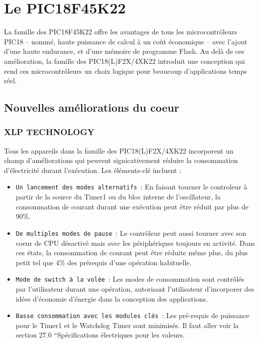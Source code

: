 \documentclass[a4paper, 12pt]{book}
\newcounter{program}[subsection]
\begin{document}
\chapter{Le PIC18F45K22}
La famille des PIC18F45K22 offre les avantages de tous les microcontrôleurs  PIC18 – nommé, haute puissance de calcul à un coût économique – avec l’ajout d’une haute endurance, et d’une mémoire de programme Flash. Au delà de ces amélioration, la famille des PIC18(L)F2X/4XK22 introduit une conception qui rend ces microcontrôleurs un choix logique pour beaucoup d’applications temps réel.\\

\section{Nouvelles améliorations du coeur}
\subsection{XLP TECHNOLOGY}
Tous les appareils dans la famille des PIC18(L)F2X/4XK22 incorporent un champ d’améliorations qui peuvent signicativement réduire la consommation d’électricité durant l’exécution. 
Les éléments-clé incluent :
\begin{itemize}
\item \texttt{Un lancement des modes alternatifs}~:
En faisant tourner le controleur à partir de la source du Timer1 ou du bloc interne de l’oscillateur, la consommation de courant durant une exécution peut être réduit par plus de 90\%.
\item \texttt{De multiples modes de pause}~:
Le contrôleur peut aussi tourner avec son coeur de CPU désactivé mais avec les périphériques toujours en activité. Dans ces états, la consommation de courant peut être réduite même plus, du plus petit tel que 4\% des prérequis d’une opération habituelle.
\item \texttt{Mode de switch à la volée}~:
Les modes de consommation sont contrôlés par l’utilisateur durant une opération, autorisant l’utilisateur d’incorporer des idées d’économie d’énergie dans la conception des applications.
\item \texttt{Basse consommation avec les modules clés}~:
Les pré-requis de puissance pour le Timer1 et le Watchdog Timer sont minimisés. Il faut aller voir la section 27.0 “Spécifications électriques pour les valeurs.\\
\end{itemize}
\end{document}
